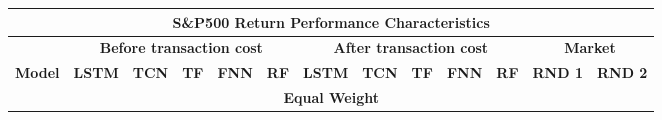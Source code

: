 \documentclass{article}
\begin{document}
\begin{table}[h]
\resizebox{\textwidth}{!}{}
\scriptsize	
\centering
\begin{tabular}{|p{2.4cm}|ccccc|ccccc|cc|}
\hline
\multicolumn{13}{|c|}{\textbf{S\&P500 Return Performance Characteristics}}\\
\hline
\multicolumn{1}{|c|}{} & \multicolumn{5}{c|}{\textbf{Before transaction cost}} & \multicolumn{5}{c|}{\textbf{After transaction cost}} & \multicolumn{2}{c|}{\textbf{Market}}\\
\hline
\textbf{Model} & \textbf{LSTM} & \textbf{TCN} & \textbf{TF} & \textbf{FNN} & \textbf{RF} & \textbf{LSTM} & \textbf{TCN} & \textbf{TF} & \textbf{FNN} & \textbf{RF}& \textbf{RND 1} &\textbf {RND 2}\\
\hline
\multicolumn{13}{|c|}{\textbf{Equal Weight}} \\ \hline


\end{tabular}
\end{table}
\end{document}
